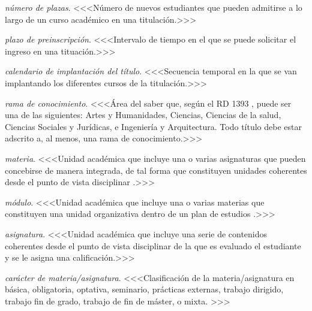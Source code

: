     \item \emph{número de plazas}. <<<Número de nuevos estudiantes que pueden admitirse a lo largo de un curso académico en una titulación.>>>

    \item \emph{plazo de preinscripción}. <<<Intervalo de tiempo en el que se puede solicitar el ingreso en una tituación.>>>

    \item \emph{calendario de implantación del título}. <<<Secuencia temporal en la que se van implantando los diferentes cursos de la titulación\cite[página 62]{guiaAneca}.>>>

    \item \emph{rama de conocimiento}. <<<Área del saber que, según el RD 1393 \cite[artículo 12, apartado 4]{rd1393}, puede ser una de las siguientes: Artes y Humanidades, Ciencias, Ciencias de la salud, Ciencias Sociales y Jurídicas, e Ingeniería y Arquitectura. Todo título debe estar adscrito a, al menos, una rama de conocimiento.>>>

    \item \emph{materia}. <<<Unidad académica que incluye una o varias asignaturas que pueden concebirse de manera integrada, de tal forma que constituyen unidades coherentes desde el punto de vista disciplinar \cite[página 33]{guiaAneca}.>>>

    \item \emph{módulo}. <<<Unidad académica que incluye una o varias materias que constituyen una unidad organizativa dentro de un plan de estudios \cite[página 33]{guiaAneca}.>>>

    \item \emph{asignatura}. <<<Unidad académica que incluye una serie de contenidos coherentes desde el punto de vista disciplinar de la que es evaluado el estudiante y se le asigna una calificación.>>>

    \item \emph{carácter de materia/asignatura}. <<<Clasificación de la materia/asignatura en básica, obligatoria, optativa, seminario, prácticas externas, trabajo dirigido, trabajo fin de grado, trabajo de fin de máster, o mixta.\cite[artículo 12, apartado 2]{rd1393} \cite[sección D.5]{guiaMadridMasD}>>>

